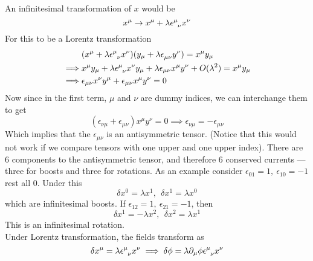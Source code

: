 \documentclass[11pt, notitlepage]{report}
\newcommand{\del}{\partial}
\numberwithin{equation}{section}
\begin{document}
    An infinitesimal transformation of \(x\) would be 
    \begin{equation*}
        x^\mu \to x^\mu + \lambda \epsilon\indices{^\mu_\nu} x^\nu
    \end{equation*}
    For this to be a Lorentz transformation 
    \begin{align*}
        &(x^\mu + \lambda \epsilon\indices{^\mu_\nu} x^\nu)(y_\mu + \lambda \epsilon\indices{_\mu_\nu} y^\nu) = x^\mu y_\mu \\
        \implies & x^\mu y_\mu + \lambda \epsilon\indices{^\mu_\nu} x^\nu y_\mu + \lambda\epsilon_{\mu\nu}x^\mu y^\nu + O(\lambda^2) = x^\mu y_\mu\\
        \implies & \epsilon_{\mu\nu}x^\nu y^\mu + \epsilon_{\mu\nu} x^\mu y^\nu = 0
    \end{align*}
    Now since in the first term, \(\mu\) and \(\nu\) are dummy indices, we can interchange them to get 
    \begin{equation*}
        \left(\epsilon_{\nu\mu}+ \epsilon_{\mu\nu}\right) x^\mu y^\nu = 0\implies  \epsilon_{\nu\mu}= - \epsilon_{\mu\nu}
    \end{equation*}
    Which implies that the \(\epsilon_{\mu\nu}\) is an antisymmetric tensor. (Notice that this would not work if we compare tensors with one upper and one upper index). There are 6 components to the antisymmetric tensor, and therefore 6 conserved currents — three for boosts and three for rotations. As an example consider \(\epsilon_{01} = 1,~\epsilon_{10} = -1\) rest all 0. Under this 
    \begin{equation*}
        \delta x^0 = \lambda x^1,~~\delta x^1 = \lambda x^0
    \end{equation*}
    which are infinitesimal boosts. If \(\epsilon_{12} = 1,~\epsilon_{21} = -1\), then 
    \begin{equation*}
        \delta x^1 = -\lambda x^2,~~\delta x^2 = \lambda x^1
    \end{equation*}
    This is an infinitesimal rotation. \\

    Under Lorentz transformation, the fields transform as 
    \begin{equation*}
        \delta x^\mu = \lambda \epsilon\indices{^\mu_\nu} x^\nu \implies \delta \phi =\lambda \del_\mu \phi \epsilon\indices{^\mu_\nu} x^\nu
    \end{equation*}
\end{document}
